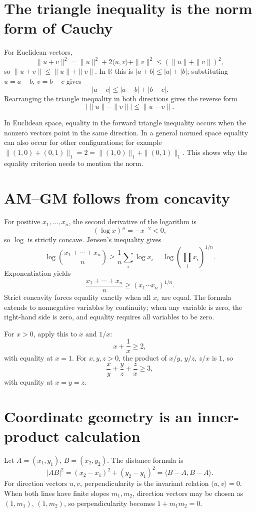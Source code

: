 \section{The triangle inequality is the norm form of Cauchy}

For Euclidean vectors,
\[
 \|u+v\|^2=\|u\|^2+2\langle u,v\rangle+\|v\|^2
 \le(\|u\|+\|v\|)^2,
\]
so \(\|u+v\|\le\|u\|+\|v\|\). In \(\mathbb R\) this is \(|a+b|\le|a|+|b|\); substituting \(u=a-b\), \(v=b-c\) gives
\[
 |a-c|\le|a-b|+|b-c|.
\]
Rearranging the triangle inequality in both directions gives the reverse form
\[
 \bigl|\|u\|-\|v\|\bigr|\le\|u-v\|.
\]

In Euclidean space, equality in the forward triangle inequality occurs when the nonzero vectors point in the same direction. In a general normed space equality can also occur for other configurations; for example \(\|(1,0)+(0,1)\|_1=2=\|(1,0)\|_1+\|(0,1)\|_1\). This shows why the equality criterion needs to mention the norm.

\section{AM--GM follows from concavity}

For positive \(x_1,\ldots,x_n\), the second derivative of the logarithm is
\[
 (\log x)''=-x^{-2}<0,
\]
so \(\log\) is strictly concave. Jensen's inequality gives
\[
 \log\left(\frac{x_1+\cdots+x_n}{n}\right)
 \ge\frac1n\sum_i\log x_i
 =\log\left(\prod_i x_i\right)^{1/n}.
\]
Exponentiation yields
\[
 \boxed{\frac{x_1+\cdots+x_n}{n}\ge
  (x_1\cdots x_n)^{1/n}.}
\]
Strict concavity forces equality exactly when all \(x_i\) are equal. The formula extends to nonnegative variables by continuity; when any variable is zero, the right-hand side is zero, and equality requires all variables to be zero.

For \(x>0\), apply this to \(x\) and \(1/x\):
\[
 x+\frac1x\ge2,
\]
with equality at \(x=1\). For \(x,y,z>0\), the product of \(x/y\), \(y/z\), \(z/x\) is \(1\), so
\[
 \frac{x}{y}+\frac{y}{z}+\frac{z}{x}\ge3,
\]
with equality at \(x=y=z\).

\section{Coordinate geometry is an inner-product calculation}

Let \(A=(x_1,y_1)\), \(B=(x_2,y_2)\). The distance formula is
\[
 |AB|^2=(x_2-x_1)^2+(y_2-y_1)^2
 =\langle B-A,B-A\rangle.
\]
For direction vectors \(u,v\), perpendicularity is the invariant relation
\(\langle u,v\rangle=0\). When both lines have finite slopes \(m_1,m_2\), direction vectors may be chosen as \((1,m_1)\), \((1,m_2)\), so perpendicularity becomes \(1+m_1m_2=0\).


